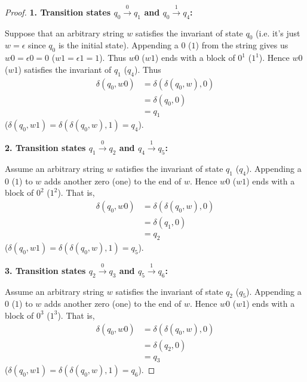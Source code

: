 \begin{proof}
        \vspace{5mm}
        
        \textbf{1. Transition states $q_0 \xrightarrow{0} q_1$ and $q_0 \xrightarrow{1} q_4$:}
        
        Suppose that an arbitrary 
        string $w$ satisfies the invariant of state $q_0$ (i.e. it's just 
        $w = \epsilon$ since $q_0$ is the initial state). Appending a $0$ ($1$)
        from the string gives us $w0 = \epsilon 0 = 0$ ($w1 = \epsilon 1 = 1$).
        Thus $w0$ ($w1$) ends with a block of $0^1$ ($1^1$). Hence $w0$ ($w1$) satisfies
        the invariant of $q_1$ ($q_4$). Thus
        \begin{align*}
            \delta(q_0, w0) &= \delta(\delta(q_0, w), 0) \\
            &= \delta(q_0, 0) \tag{by assumption} \\
            &= q_1
        \end{align*}
        ($\delta(q_0, w1) = \delta(\delta(q_0, w), 1) = q_4$).
        
        \vspace{5mm}
        
        \textbf{2. Transition states $q_1 \xrightarrow{0} q_2$ and $q_4 \xrightarrow{1} q_5$:}
        
        Assume an arbitrary string $w$ satisfies the invariant of state $q_1$ ($q_4$). 
        Appending a $0$ ($1$) to $w$ adds another zero (one) to the end of $w$. Hence
        $w0$ ($w1$) ends with a block of $0^2$ ($1^2$). That is,
        \begin{align*}
            \delta(q_0, w0) &= \delta(\delta(q_0, w), 0) \\
            &= \delta(q_1, 0) \tag{by assumption} \\
            &= q_2
        \end{align*}
        ($\delta(q_0, w1) = \delta(\delta(q_0, w), 1) = q_5$).
        
        \vspace{5mm}
        
        \textbf{3. Transition states $q_2 \xrightarrow{0} q_3$ and $q_5 \xrightarrow{1} q_6$:}
        
        Assume an arbitrary string $w$ satisfies the invariant of state $q_2$ ($q_5$). 
        Appending a $0$ ($1$) to $w$ adds another zero (one) to the end of $w$. Hence
        $w0$ ($w1$) ends with a block of $0^3$ ($1^3$). That is,
        \begin{align*}
            \delta(q_0, w0) &= \delta(\delta(q_0, w), 0) \\
            &= \delta(q_2, 0) \tag{by assumption} \\
            &= q_3
        \end{align*}
        ($\delta(q_0, w1) = \delta(\delta(q_0, w), 1) = q_6$).
        

\end{proof}
